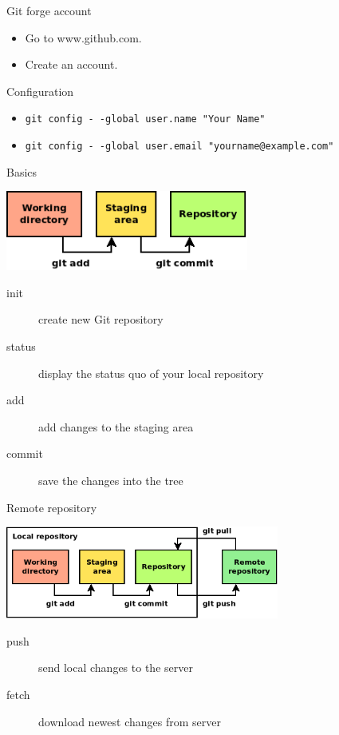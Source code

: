 \documentclass[14pt]{beamer}
\begin{document}
	\begin{frame}{Git forge account}
	\begin{itemize}
		\item Go to www.github.com.
		\item Create an account.
	\end{itemize}
	\end{frame}


	\begin{frame}{Configuration}
		\begin{itemize}
		\item \texttt{git config -\,-global user.name "Your Name"}
		\item \texttt{git config -\,-global user.email "yourname@example.com"}
		\end{itemize}
	\end{frame}

	\begin{frame}{Basics}
        \begin{center}
	    \includegraphics[width=8cm]{commit.png}
        \end{center}
		\begin{description}
		\item[init] create new Git repository
		\item[status] display the status quo of your local repository
		\item[add] add changes to the staging area
		\item[commit] save the changes into the tree
		\end{description}
	\end{frame}

	\begin{frame}{Remote repository}
        \begin{center}
	    \includegraphics[width=9cm]{remote.png}
        \end{center}
		\begin{description}
		\item[push] send local changes to the server
		\item[fetch] download newest changes from server
		\end{description}
	\end{frame}
\end{document}

